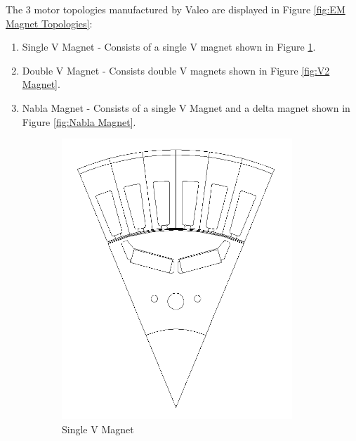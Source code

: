 \documentclass{report} %
\begin{document}
The 3 motor topologies manufactured by Valeo are displayed in Figure \ref{fig:EM Magnet Topologies}:
\begin{enumerate}
    \item Single V Magnet - Consists of a single V magnet shown in Figure \ref{fig:V1 Magnet}.
    \item Double V Magnet - Consists double V magnets shown in Figure \ref{fig:V2 Magnet}.
    \item Nabla Magnet - Consists of a single V Magnet and a delta magnet shown in Figure \ref{fig:Nabla Magnet}.
\end{enumerate}

\begin{figure}[H]
    \centering
    \begin{subfigure}{0.32\textwidth}
        \centering
        \includegraphics[width=\textwidth]{./ReportImages/1V_Magnet.png}
        \caption{Single V Magnet}
        \label{fig:V1 Magnet}
    \end{subfigure}\hfill
    \begin{subfigure}{0.32\textwidth}
        \centering

\end{subfigure}
\end{figure}
\end{document}
